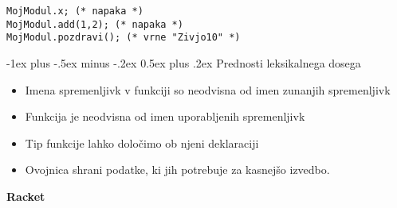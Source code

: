 \documentclass[a3paper,10pt]{extarticle}
\makeatletter
\renewcommand{\section}{\@startsection{section}{1}{0mm}%
                                {-1ex plus -.5ex minus -.2ex}%
                                {0.5ex plus .2ex}%
                                {\normalfont\large\bfseries}}
\makeatother
\begin{document}
\begin{multicols}{4}
\begin{lstlisting}
MojModul.x; (* napaka *)
MojModul.add(1,2); (* napaka *)
MojModul.pozdravi(); (* vrne "Zivjo10" *)
\end{lstlisting}

\section{Prednosti leksikalnega dosega}
\begin{itemize}
    \item Imena spremenljivk v funkciji so neodvisna od imen zunanjih spremenljivk
    \item Funkcija je neodvisna od imen uporabljenih spremenljivk
    \item Tip funkcije lahko določimo ob njeni deklaraciji
    \item Ovojnica shrani podatke, ki jih potrebuje za kasnejšo izvedbo.
\end{itemize}

\end{multicols}

\pagebreak
\begin{center}
    \Large{\textbf{Racket}} \\
\end{center}
\end{document}
